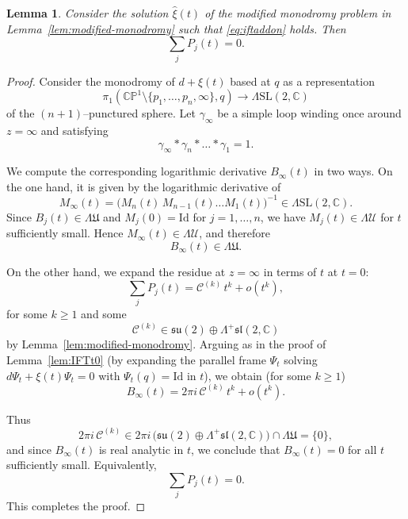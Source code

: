 \documentclass[12pt,a4paper]{amsart}
\newtheorem{lemma}[theorem]{Lemma}
\theoremstyle{definition}
\theoremstyle{remark}
\newcommand{\C}{\mathbb C}
\newcommand{\CP}{\mathbb{CP}}
\begin{document}





\begin{lemma}\label{lem:sum-P-zero}
Consider the solution $\hat\xi(t)$ of the modified monodromy problem
in Lemma~\ref{lem:modified-monodromy} such that \eqref{eq:iftaddon} holds.
Then
\[
\sum_j P_j(t)=0.
\]
\end{lemma}

\begin{proof}
Consider the monodromy of $d+\xi(t)$ based at $q$ as a representation
\[
\pi_1(\CP^1\setminus\{p_1,\dots,p_n,\infty\},q)\to\Lambda\mathrm{SL}(2,\C)
\]
of the $(n+1)$--punctured sphere.
Let $\gamma_\infty$ be a simple loop winding once around $z=\infty$ and satisfying
\[
\gamma_\infty * \gamma_n * \dots * \gamma_1 = 1.
\]

We compute the corresponding logarithmic derivative $B_\infty(t)$ in two ways.
On the one hand, it is given by the logarithmic derivative of
\[
M_\infty(t)
=
\bigl(M_n(t)\, M_{n-1}(t)\dots M_1(t)\bigr)^{-1}
\in
\Lambda\mathrm{SL}(2,\C).
\]
Since $B_j(t)\in\Lambda\mathfrak U$ and $M_j(0)=\mathrm{Id}$ for $j=1,\dots,n$,
we have $M_j(t)\in\Lambda\mathcal U$ for $t$ sufficiently small.
Hence $M_\infty(t)\in\Lambda\mathcal U$, and therefore
\[
B_\infty(t)\in\Lambda\mathfrak U.
\]

On the other hand, we expand the residue at $z=\infty$ in terms of $t$ at $t=0$:
\[
\sum_j P_j(t)= \mathcal C^{(k)}\, t^{k}+o(t^{k}),
\]
for some $k\geq1$ and some
\[
\mathcal C^{(k)}\in \mathfrak{su}(2)\oplus \Lambda^{+}\mathfrak{sl}(2,\C)
\]
by Lemma~\ref{lem:modified-monodromy}.
Arguing as in the proof of Lemma~\ref{lem:IFTt0}
(by expanding the parallel frame $\Psi_t$ solving
$d\Psi_t+\xi(t)\Psi_t=0$ with $\Psi_t(q)=\mathrm{Id}$ in $t$),
we obtain (for some $k\geq1$)
\[
B_\infty(t)=2\pi i\, \mathcal C^{(k)}\, t^{k}+o(t^{k}).
\]

Thus
\[
2\pi i\, \mathcal C^{(k)}\in 2\pi i\,
\bigl(\mathfrak{su}(2)\oplus \Lambda^{+}\mathfrak{sl}(2,\C)\bigr)
\cap \Lambda\mathfrak U
=
\{0\},
\]
and since $B_\infty(t)$ is real analytic in $t$, we conclude that
$B_\infty(t)=0$ for all $t$ sufficiently small.
Equivalently,
\[
\sum_j P_j(t)=0.
\]
This completes the proof.
\end{proof}
\end{document}
